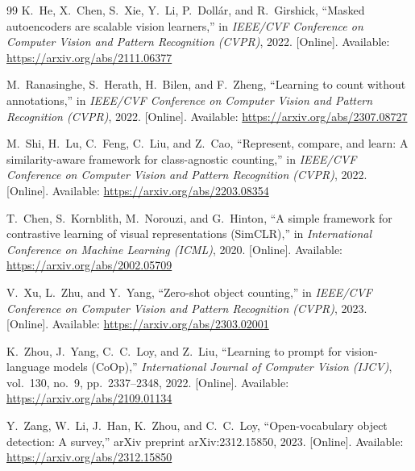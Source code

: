 \documentclass[a4paper,12pt]{report}
\numberwithin{figure}{chapter}
\numberwithin{table}{chapter}
\begin{document}
\begin{thebibliography}{99}
K.~He, X.~Chen, S.~Xie, Y.~Li, P.~Doll{\'a}r, and R.~Girshick,
``Masked autoencoders are scalable vision learners,''
in \emph{IEEE/CVF Conference on Computer Vision and Pattern
Recognition (CVPR)}, 2022.
[Online]. Available:
\url{https://arxiv.org/abs/2111.06377}

M.~Ranasinghe, S.~Herath, H.~Bilen, and F.~Zheng,
``Learning to count without annotations,''
in \emph{IEEE/CVF Conference on Computer Vision and Pattern
Recognition (CVPR)}, 2022.
[Online]. Available:
\url{https://arxiv.org/abs/2307.08727}

M.~Shi, H.~Lu, C.~Feng, C.~Liu, and Z.~Cao,
``Represent, compare, and learn: A similarity-aware framework
for class-agnostic counting,''
in \emph{IEEE/CVF Conference on Computer Vision and Pattern
Recognition (CVPR)}, 2022.
[Online]. Available:
\url{https://arxiv.org/abs/2203.08354}

T.~Chen, S.~Kornblith, M.~Norouzi, and G.~Hinton,
``A simple framework for contrastive learning of visual
representations (SimCLR),''
in \emph{International Conference on Machine Learning (ICML)}, 2020.
[Online]. Available:
\url{https://arxiv.org/abs/2002.05709}

V.~Xu, L.~Zhu, and Y.~Yang,
``Zero-shot object counting,''
in \emph{IEEE/CVF Conference on Computer Vision and Pattern
Recognition (CVPR)}, 2023.
[Online]. Available:
\url{https://arxiv.org/abs/2303.02001}

K.~Zhou, J.~Yang, C.~C.~Loy, and Z.~Liu,
``Learning to prompt for vision-language models (CoOp),''
\emph{International Journal of Computer Vision (IJCV)}, vol.~130,
no.~9, pp.~2337--2348, 2022.
[Online]. Available:
\url{https://arxiv.org/abs/2109.01134}

Y.~Zang, W.~Li, J.~Han, K.~Zhou, and C.~C.~Loy,
``Open-vocabulary object detection: A survey,''
arXiv preprint arXiv:2312.15850, 2023.
[Online]. Available:
\url{https://arxiv.org/abs/2312.15850}

\end{thebibliography}
\end{document}
